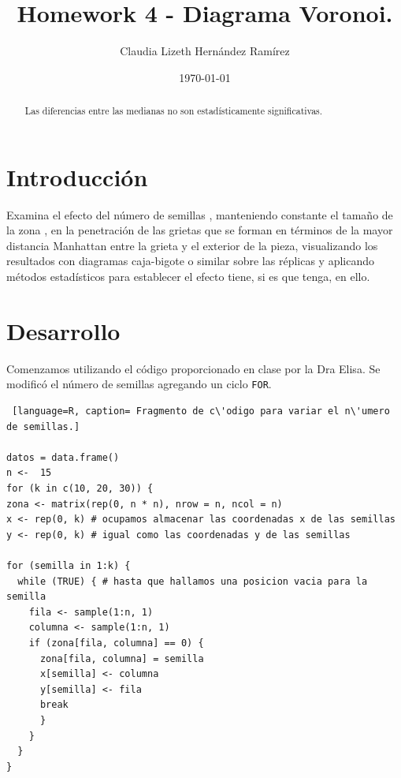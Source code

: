 \documentclass{article}
\author{Claudia Lizeth Hern\'andez Ram\'irez} %
\title{Homework 4 - Diagrama Voronoi.} %
\date{\today}
\begin{document}

\maketitle %

\begin{abstract} %
  \centering
Las diferencias entre las medianas no son estad\'{i}sticamente significativas.
  
\end{abstract}


\section{Introducci\'{o}n}\label{intro} %
Examina el efecto del n\'umero de semillas , manteniendo constante el tamaño de la zona , en la penetraci\'on de las grietas que se forman en t\'erminos de la mayor distancia Manhattan entre la grieta y el exterior de la pieza, visualizando los resultados con diagramas caja-bigote o similar sobre las r\'eplicas y aplicando m\'etodos estad\'isticos para establecer el efecto tiene, si es que tenga,  en ello.



\section{Desarrollo}\label{desarrollo} %

Comenzamos utilizando el c\'odigo proporcionado en clase por la Dra Elisa\citep{CodigoBase}.
Se modific\'o el n\'umero de semillas agregando un ciclo \texttt{FOR}.
\begin{lstlisting} [language=R, caption= Fragmento de c\'odigo para variar el n\'umero de semillas.]

datos = data.frame()
n <-  15
for (k in c(10, 20, 30)) {
zona <- matrix(rep(0, n * n), nrow = n, ncol = n)
x <- rep(0, k) # ocupamos almacenar las coordenadas x de las semillas
y <- rep(0, k) # igual como las coordenadas y de las semillas

for (semilla in 1:k) {
  while (TRUE) { # hasta que hallamos una posicion vacia para la semilla
    fila <- sample(1:n, 1)
    columna <- sample(1:n, 1)
    if (zona[fila, columna] == 0) {
      zona[fila, columna] = semilla
      x[semilla] <- columna
      y[semilla] <- fila
      break
      }
    }
  }
}
\end{lstlisting}
\end{document}
